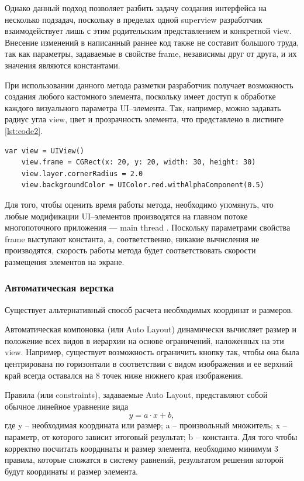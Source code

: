 Однако данный подход позволяет разбить задачу создания интерфейса на несколько подзадач, поскольку в пределах одной superview разработчик взаимодействует лишь с этим родительским представлением и конкретной view. Внесение изменений в написанный раннее код также не составит большого труда, так как параметры, задаваемые в свойстве frame, независимы друг от друга, и их значения являются константами.

При использовании данного метода разметки разработчик получает возможность создания любого кастомного элемента, поскольку имеет доступ к обработке каждого визуального параметра UI--элемента. 
Так, например, можно задавать радиус угла view, цвет и прозрачность элемента, что представлено в листинге \ref{lst:code2}.

\begin{lstlisting}[label=lst:code2, caption=Задание параметров view]
	var view = UIView()
	view.frame = CGRect(x: 20, y: 20, width: 30, height: 30)
	view.layer.cornerRadius = 2.0
	view.backgroundColor = UIColor.red.withAlphaComponent(0.5)
\end{lstlisting}

Для того, чтобы оценить время работы метода, необходимо упомянуть, что любые модификации UI--элементов производятся на главном потоке многопоточного приложения --- main thread \cite{mainthread}. Поскольку параметрами свойства frame выступают константа, а, соответственно, никакие вычисления не производятся, скорость работы метода будет соответствовать скорости размещения элементов на экране. 

\subsubsection{Автоматическая верстка}

Существует альтернативный способ расчета необходимых координат и размеров. 

Автоматическая компоновка (или Auto Layout) \cite{autolayout} динамически вычисляет размер и положение всех видов в иерархии на основе ограничений, наложенных на эти view. Например, существует возможность ограничить кнопку так, чтобы она была центрирована по горизонтали в соответствии с видом изображения и ее верхний край всегда оставался на 8 точек ниже нижнего края изображения. 

Правила (или constraints), задаваемые Auto Layout, представляют собой обычное линейное уравнение вида \begin{equation}
	y = a \cdot x + b,
\end{equation}
где y – необходимая координата или размер; a – произвольный множитель; x – параметр, от которого зависит итоговый результат; b – константа. Для того чтобы корректно посчитать координаты и размер элемента, необходимо минимум 3 правила, которые сложатся в систему равнений, результатом решения которой будут координаты и размер элемента.

